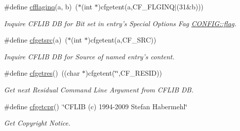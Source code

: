 \begin{CompactItemize}
\#define \hyperlink{group__retrieval_g09929d4a48932749dd9d0d32d0f3f08c}{cfflaginq}(a, b)~($\ast$(int $\ast$)cfgetent(a,CF\_\-FLGINQ$|$(31\&b)))
\begin{CompactList}\small\item\em Inquire CFLIB DB for Bit set in entry's Special Options Fag \hyperlink{struct_c_o_n_f_i_g_b04d08abdf758c0400caaded716f4089}{CONFIG::flag}. \item\end{CompactList}\item 
\#define \hyperlink{group__retrieval_gdf84eed41bdaa0a6cd8cd474c79d50b1}{cfgetsrc}(a)~($\ast$(int $\ast$)cfgetent(a,CF\_\-SRC))
\begin{CompactList}\small\item\em Inquire CFLIB DB for Source of named entry's content. \item\end{CompactList}\item 
\#define \hyperlink{group__retrieval_g6ef6076e946383ab198ee26b9aa5603a}{cfgetres}()~((char $\ast$)cfgetent(\char`\"{}\char`\"{},CF\_\-RESID))
\begin{CompactList}\small\item\em Get next Residual Command Line Argument from CFLIB DB. \item\end{CompactList}\item 
\#define \hyperlink{group__retrieval_g9999522b2acf8760f420d2567e7f7c50}{cfgetcpr}()~\char`\"{}CFLIB (c) 1994-2009 Stefan Habermehl\char`\"{}
\begin{CompactList}\small\item\em Get Copyright Notice. \item\end{CompactList}\end{CompactItemize}
